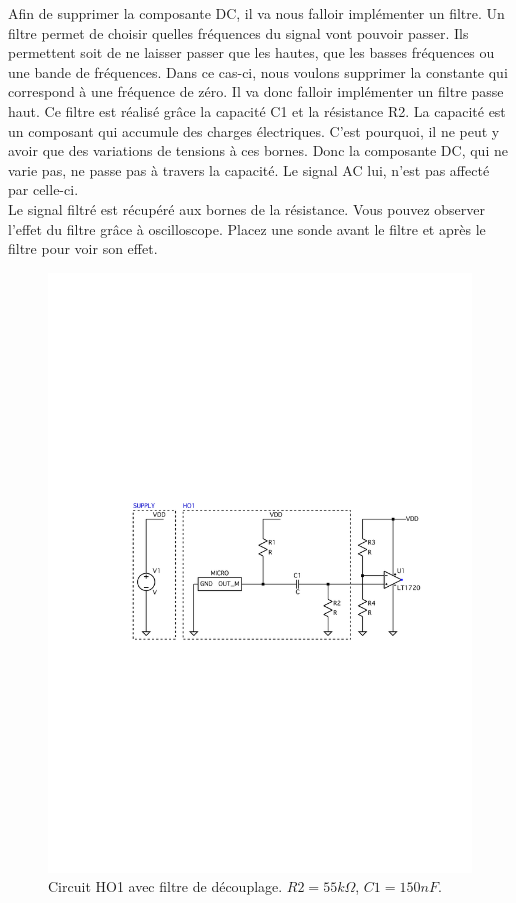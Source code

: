 Afin de supprimer la composante DC, il va nous falloir implémenter un filtre. Un filtre permet de choisir quelles fréquences du signal vont pouvoir passer. Ils permettent soit de ne laisser passer que les hautes, que les basses fréquences ou une bande de fréquences.
Dans ce cas-ci, nous voulons supprimer la constante qui correspond à une fréquence de zéro. Il va donc falloir implémenter un filtre passe haut. Ce filtre est réalisé grâce la capacité C1 et la résistance R2. La capacité est un composant qui accumule des charges électriques. C'est pourquoi, il ne peut y avoir que des variations de tensions à ces bornes. Donc la composante DC, qui ne varie pas, ne passe pas à travers la capacité. Le signal AC lui, n'est pas affecté par celle-ci. \\

Le signal filtré est récupéré aux bornes de la résistance. Vous pouvez observer l'effet du filtre grâce à oscilloscope. Placez une sonde avant le filtre et après le filtre pour voir son effet. 

\begin{figure}[!ht]
	\centering
	\includegraphics[width=.75\textwidth]{figures/Circuit_P1.pdf}
	\caption{Circuit HO1 avec filtre de découplage. $R2 = 55 k\Omega$, $C1 = 150n F$.}
	\label{fig:circuit_H01_filtre}
\end{figure}
